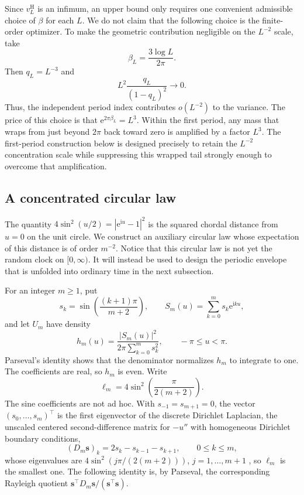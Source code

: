 \documentclass[11pt]{article}
\numberwithin{equation}{section}
\theoremstyle{remark}
\newcommand{\e}{\mathrm e}
\newcommand{\ii}{\mathrm i}
\newcommand{\abs}[1]{\left|#1\right|}
\newcommand{\vH}{v^{\mathrm H}}
\begin{document}
Since $\vH_L$ is an infimum, an upper bound only requires one convenient admissible choice of $\beta$ for each $L$. We do not claim that the following choice is the finite-order optimizer. To make the geometric contribution negligible on the $L^{-2}$ scale, take
\begin{equation}\label{eq:a-log-scale}
  \beta_L=\frac{3\log L}{2\pi}.
\end{equation}
Then $q_L=L^{-3}$ and
\begin{equation}\label{eq:replica-negligible}
  L^2\frac{q_L}{(1-q_L)^2}\longrightarrow0.
\end{equation}
Thus, the independent period index contributes $o(L^{-2})$ to the variance. The price of this choice is that $\e^{2\pi\beta_L}=L^3$. Within the first period, any mass that wraps from just beyond $2\pi$ back toward zero is amplified by a factor $L^3$. The first-period construction below is designed precisely to retain the $L^{-2}$ concentration scale while suppressing this wrapped tail strongly enough to overcome that amplification.

\subsection{A concentrated circular law}
The quantity $4\sin^2(u/2)=|\e^{\ii u}-1|^2$ is the squared chordal distance from $u=0$ on the unit circle. We construct an auxiliary circular law whose expectation of this distance is of order $m^{-2}$. Notice that this circular law is not yet the random clock on $[0,\infty)$. It will instead be used to design the periodic envelope that is unfolded into ordinary time in the next subsection.

For an integer $m\geq1$, put
\[
  s_k=\sin\!\left(\frac{(k+1)\pi}{m+2}\right),\qquad
  S_m(u)=\sum_{k=0}^{m}s_k\e^{\ii ku},
\]
and let $U_m$ have density
\[
  h_m(u)=\frac{\abs{S_m(u)}^2}
                   {2\pi\sum_{k=0}^{m}s_k^2},
  \qquad -\pi\leq u<\pi.
\]
Parseval's identity shows that the denominator normalizes $h_m$ to integrate to one. The coefficients are real, so $h_m$ is even. Write
\[
  \ell_m=4\sin^2\!\left(\frac{\pi}{2(m+2)}\right).
\]
The sine coefficients are not ad hoc. With $s_{-1}=s_{m+1}=0$, the vector $(s_0,\ldots,s_m)^{\top}$ is the first eigenvector of the discrete Dirichlet Laplacian, the unscaled centered second-difference matrix for $-u''$ with homogeneous Dirichlet boundary conditions,
\[
  (D_m\bm s)_k=2s_k-s_{k-1}-s_{k+1},\qquad 0\leq k\leq m,
\]
whose eigenvalues are $4\sin^2(j\pi/(2(m+2)))$, $j=1,\ldots,m+1$ \citep[Section~3]{StrangMacNamara2014}, so $\ell_m$ is the smallest one. The following identity is, by Parseval, the corresponding Rayleigh quotient $\bm s^{\top}D_m\bm s/(\bm s^{\top}\bm s)$.
\end{document}
